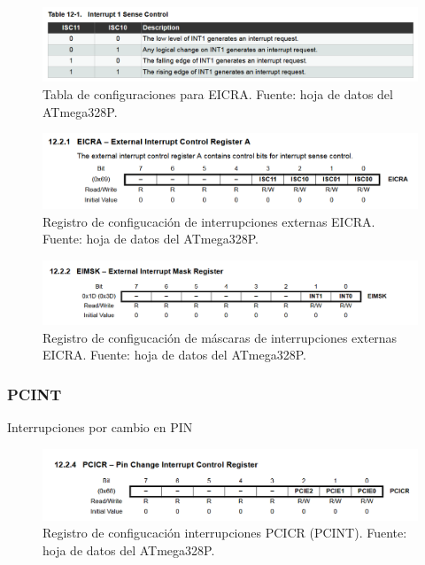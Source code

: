     \begin{figure}[H]
    \centering
    \includegraphics[width=\linewidth]{./Anexos/Marco Teorico/External Interrupts/EICRA table.png}
    \caption{Tabla de configuraciones para EICRA. Fuente: hoja de datos del ATmega328P\@\cite{atmega328p_datasheet}.}
    \label{fig:EICRA-table}
    \end{figure}

    \begin{figure}[H]
    \centering
    \includegraphics[width=\linewidth]{./Anexos/Marco Teorico/External Interrupts/EICRA.png}
    \caption{Registro de configucación de interrupciones externas EICRA. Fuente: hoja de datos del ATmega328P\@\cite{atmega328p_datasheet}.}
    \label{fig:EICRA}
    \end{figure}

    \begin{figure}[H]
    \centering
    \includegraphics[width=\linewidth]{./Anexos/Marco Teorico/External Interrupts/EIMSK.png}
    \caption{Registro de configucación de máscaras de interrupciones externas EICRA. Fuente: hoja de datos del ATmega328P\@\cite{atmega328p_datasheet}.}
    \label{fig:EIMSK}
    \end{figure}

    \subsubsection{PCINT}
    Interrupciones por cambio en PIN


    \begin{figure}[H]
    \centering
    \includegraphics[width=\linewidth]{./Anexos/Marco Teorico/External Interrupts/PCICR.png}
    \caption{Registro de configucación interrupciones PCICR (PCINT). Fuente: hoja de datos del ATmega328P\@\cite{atmega328p_datasheet}.}
    \label{fig:PCICR}
    \end{figure}

